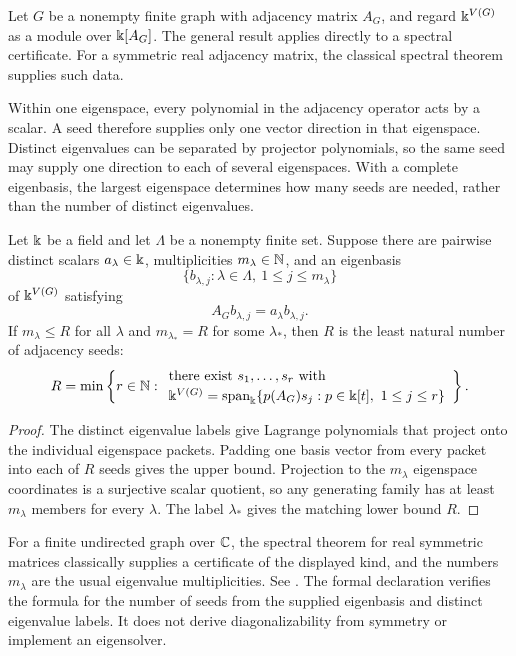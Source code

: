 Let $G$ be a nonempty finite graph with adjacency matrix $A_G$, and regard
$\Bbbk^{V(G)}$ as a module over $\Bbbk[A_G]$.  The general result applies directly to a spectral certificate. For a symmetric real adjacency matrix, the classical spectral theorem supplies such data.

Within one eigenspace, every polynomial in the adjacency operator acts by a scalar. A seed therefore supplies only one vector direction in that eigenspace. Distinct eigenvalues can be separated by projector polynomials, so the same seed may supply one direction to each of several eigenspaces. With a complete eigenbasis, the largest eigenspace determines how many seeds are needed, rather than the number of distinct eigenvalues.

\begin{corollary}
\label{cor:graph-rank}
Let $\Bbbk$ be a field and let $\Lambda$ be a nonempty finite set.  Suppose
there are pairwise distinct scalars $a_{\lambda}\in\Bbbk$, multiplicities
$m_{\lambda}\in\mathbb N$, and an eigenbasis
\[
\{b_{\lambda,j}:\lambda\in\Lambda,\ 1\le j\le m_{\lambda}\}
\]
of $\Bbbk^{V(G)}$ satisfying
\[
A_Gb_{\lambda,j}=a_{\lambda}b_{\lambda,j}.
\]
If $m_{\lambda}\le R$ for all $\lambda$ and
$m_{\lambda_*}=R$ for some $\lambda_*$, then $R$ is the least natural number
of adjacency seeds:
\[
{
R=\min\left\{r\in\mathbb N:
\begin{array}{l}
\text{there exist }s_1,\ldots,s_r\text{ with}\\[2pt]
\Bbbk^{V(G)}=\operatorname{span}_{\Bbbk}
  \{p(A_G)s_j:p\in\Bbbk[t],\ 1\le j\le r\}
\end{array}
\right\}.
}
\]
\end{corollary}

\begin{proof}
The distinct eigenvalue labels give Lagrange polynomials that project onto
the individual eigenspace packets.  Padding one basis vector from every
packet into each of $R$ seeds gives the upper bound.  Projection to the
$m_{\lambda}$ eigenspace coordinates is a surjective scalar quotient, so any
generating family has at least $m_{\lambda}$ members for every $\lambda$.
The label $\lambda_*$ gives the matching lower bound $R$.
\end{proof}

\begin{boundary}
For a finite undirected graph over $\mathbb C$, the spectral theorem for real symmetric matrices
classically supplies a certificate of the displayed kind, and the numbers
$m_{\lambda}$ are the usual eigenvalue multiplicities. See
\cite{brouwerHaemers2012}.  The formal declaration verifies the
formula for the number of seeds from the supplied eigenbasis and distinct eigenvalue
labels.  It does not derive diagonalizability from symmetry or implement an
eigensolver.
\end{boundary}

